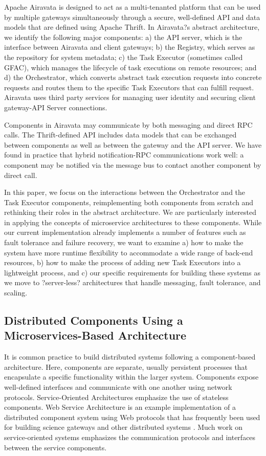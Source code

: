 \documentclass[review]{elsarticle}
\begin{document}
Apache Airavata is designed to act as a multi-tenanted platform that can be used by multiple gateways simultaneously through a secure, well-defined API and data models that are defined using Apache Thrift.   In Airavata?s abstract architecture, we identify the following major components: a) the API server, which is the interface between Airavata and client gateways; b) the Registry, which serves as the repository for system metadata; c) the Task Executor (sometimes called GFAC), which manages the lifecycle of task executions on remote resources; and d) the Orchestrator, which converts abstract task execution requests into concrete requests and routes them to the specific Task Executors that can fulfill request.  Airavata uses third party services for managing user identity and securing client gateway-API Server connections.  

Components in Airavata may communicate by both messaging and direct RPC calls.  The Thrift-defined API includes data models that can be exchanged between components as well as between the gateway and the API server.  We have found in practice that hybrid notification-RPC communications work well: a component may be notified via the message bus to contact another component by direct call.

In this paper, we focus on the interactions between the Orchestrator and the Task Executor components, reimplementing both components from scratch and rethinking their roles in the abstract architecture. We are particularly interested in applying the concepts of microservice architectures to these components.  While our current implementation already implements a number of features such as fault tolerance and failure recovery, we want to examine a) how to make the system have more runtime flexibility to accommodate a wide range of back-end resources, b) how to make the process of adding new Task Executors into a lightweight process, and c) our specific requirements for building these systems as we move to ?server-less? architectures that handle messaging, fault tolerance, and scaling.

\subsection{Distributed Components Using a Microservices-Based Architecture}
It is common practice to build distributed systems following a component-based architecture. Here, components are separate, usually persistent processes that encapsulate a specific functionality within the larger system. Components expose well-defined interfaces and communicate with one another using network protocols.  Service-Oriented Architectures emphasize the use of stateless components. Web Service Architecture is an example implementation of a distributed component system using Web protocols that has frequently been used for building science gateways and other distributed systems \cite{kacsuk2012ws}\cite{marzolla2007open}.   Much work on service-oriented systems emphasizes the communication protocols and interfaces between the service components. 
\end{document}
